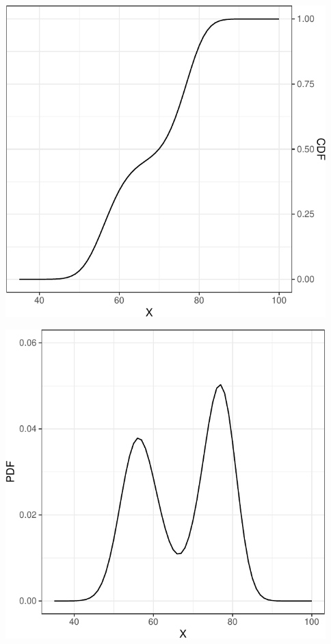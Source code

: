 \documentclass[
]{article}
\begin{document}
\includegraphics[width=468px]{plot_calibration_files/figure-latex/t4-1}

\includegraphics[width=468px]{plot_calibration_files/figure-latex/t5-1}
\end{document}
